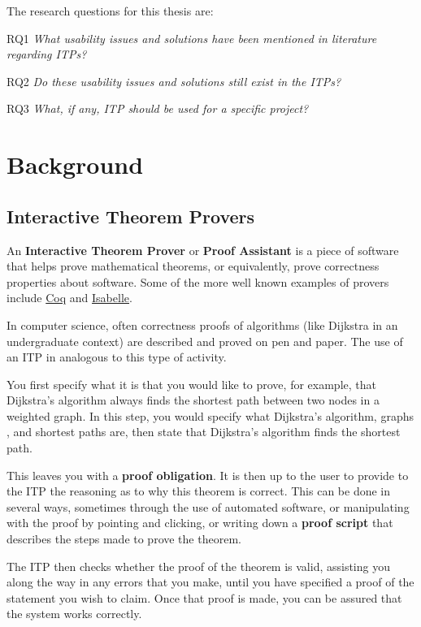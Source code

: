 \documentclass[
]{article}
\begin{document}
The research questions for this thesis are:

RQ1 \emph{What usability issues and solutions have been mentioned in
literature regarding ITPs?}

RQ2 \emph{Do these usability issues and solutions still exist in the
ITPs?}

RQ3 \emph{What, if any, ITP should be used for a specific project?}

\hypertarget{background}{%
\section{Background}\label{background}}

\hypertarget{sec:background_itp}{%
\subsection{Interactive Theorem Provers}\label{sec:background_itp}}

An \textbf{Interactive Theorem Prover} or \textbf{Proof Assistant} is a
piece of software that helps prove mathematical theorems, or
equivalently, prove correctness properties about software. Some of the
more well known examples of provers include
\href{https://coq.inria.fr/}{Coq} and
\href{https://isabelle.in.tum.de/}{Isabelle}.

In computer science, often correctness proofs of algorithms (like
Dijkstra in an undergraduate context) are described and proved on pen
and paper. The use of an ITP in analogous to this type of activity.

You first specify what it is that you would like to prove, for example,
that Dijkstra's algorithm always finds the shortest path between two
nodes in a weighted graph. In this step, you would specify what
Dijkstra's algorithm, graphs , and shortest paths are, then state that
Dijkstra's algorithm finds the shortest path.

This leaves you with a \textbf{proof obligation}. It is then up to the
user to provide to the ITP the reasoning as to why this theorem is
correct. This can be done in several ways, sometimes through the use of
automated software, or manipulating with the proof by pointing and
clicking, or writing down a \textbf{proof script} that describes the
steps made to prove the theorem.

The ITP then checks whether the proof of the theorem is valid, assisting
you along the way in any errors that you make, until you have specified
a proof of the statement you wish to claim. Once that proof is made, you
can be assured that the system works correctly.
\end{document}
